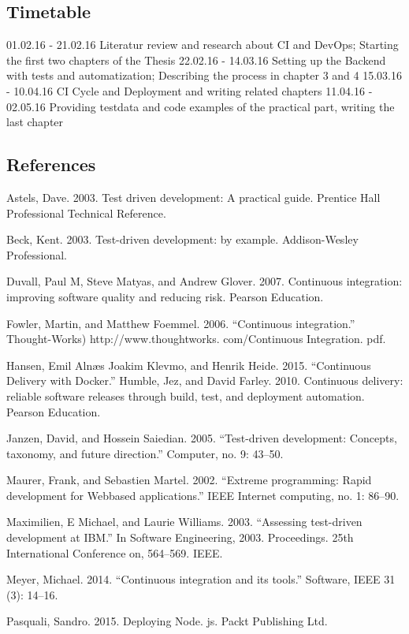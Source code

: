 \subsection{Timetable}
01.02.16 - 21.02.16 Literatur review and research about CI and DevOps; Starting the first two chapters of the Thesis
22.02.16 - 14.03.16 Setting up the Backend with tests and automatization; Describing the process in chapter 3 and 4
15.03.16 - 10.04.16 CI Cycle and Deployment and writing related chapters
11.04.16 - 02.05.16 Providing testdata and code examples of the practical part, writing the last chapter

\subsection{References}

Astels, Dave. 2003. Test driven development: A practical guide. Prentice Hall Professional Technical Reference.

Beck, Kent. 2003. Test-driven development: by example. Addison-Wesley Professional.

Duvall, Paul M, Steve Matyas, and Andrew Glover. 2007. Continuous integration: improving software quality and reducing risk. Pearson Education.

Fowler, Martin, and Matthew Foemmel. 2006. “Continuous integration.” Thought-Works) http://www.thoughtworks. com/Continuous Integration. pdf.

Hansen, Emil Alnæs Joakim Klevmo, and Henrik Heide. 2015. “Continuous Delivery with Docker.” Humble, Jez, and David Farley. 2010. Continuous delivery: reliable software releases through build, test, and deployment automation. Pearson Education.

Janzen, David, and Hossein Saiedian. 2005. “Test-driven development: Concepts, taxonomy, and future direction.” Computer, no. 9: 43–50.

Maurer, Frank, and Sebastien Martel. 2002. “Extreme programming: Rapid development for Webbased applications.” IEEE Internet computing, no. 1: 86–90.

Maximilien, E Michael, and Laurie Williams. 2003. “Assessing test-driven development at IBM.” In Software Engineering, 2003. Proceedings. 25th International Conference on, 564–569. IEEE.

Meyer, Michael. 2014. “Continuous integration and its tools.” Software, IEEE 31 (3): 14–16.

Pasquali, Sandro. 2015. Deploying Node. js. Packt Publishing Ltd.

